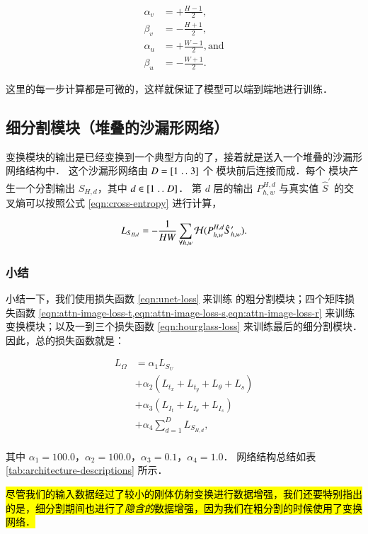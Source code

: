 $$
\begin{aligned}
\alpha_v & = +\frac{H-1}{2},               \\
\beta_v  & = -\frac{H+1}{2},              \\
\alpha_u & = +\frac{W-1}{2}, \mathrm{ and} \\
\beta_u  & = - \frac{W+1}{2}.
\end{aligned}
$$

\noindent 这里的每一步计算都是可微的，这样就保证了模型可以端到端地进行训练．

\subsection{细分割模块（堆叠的沙漏形网络）}\label{sec:hourglass}

变换模块的输出是已经变换到一个典型方向的了，接着就是送入一个堆叠的沙漏形网络结构中．
这个沙漏形网络由 $D = [1 \mathrel{{.}\,{.}}\nobreak 3]$ 个 \UNet{} 模块前后连接而成．每个 \UNet{} 模块产生一个分割输出 $S_{H,d}$，其中 $d \in [1 \mathrel{{.}\,{.}}\nobreak D]$．
第 $d$ 层的输出 $P^{H,d}_{h,w}$ 与真实值 $\hat{S}^\prime$ 的交叉熵可以按照公式 \eqref{eqn:cross-entropy} 进行计算，

\begin{equation}\label{eqn:hourglass-loss}
L_{S_{H,d}} = -\frac{1}{HW} \sum_{\forall h,w} \mathcal{H}(P^{H,d}_{h,w}\hat{S}^\prime_{h,w}).
\end{equation}

\subsubsection{小结}

小结一下，我们使用损失函数 \cref{eqn:unet-loss} 来训练 \omeganet{} 的粗分割模块；四个矩阵损失函数 \cref{eqn:attn-image-loss-t,eqn:attn-image-loss-s,eqn:attn-image-loss-r} 来训练变换模块；以及一到三个损失函数 \cref{eqn:hourglass-loss} 来训练最后的细分割模块．
因此，总的损失函数就是：

\begin{equation}
\begin{aligned}
L_\Omega & = \alpha_1 L_{S_U} \\
  & + \alpha_2 (L_{t_x} + L_{t_y} + L_{\theta}+ L_{s}) \\
  & + \alpha_3 (L_{I_t} + L_{I_\theta} + L_{I_s}) \\
  & + \alpha_4 \sum_{d=1}^D L_{S_{H,d}}, \\
\end{aligned}
\end{equation}

\noindent 其中 $\alpha_1 = 100.0$，$\alpha_2 = 100.0$，$\alpha_3 = 0.1$，$\alpha_4 = 1.0$．
网络结构总结如表 \ref{tab:architecture-descriptions} 所示．

\hl{
尽管我们的输入数据经过了较小的刚体仿射变换进行数据增强，我们还要特别指出的是，细分割期间也进行了\emph{隐含的}数据增强，因为我们在粗分割的时候使用了变换网络．
}
